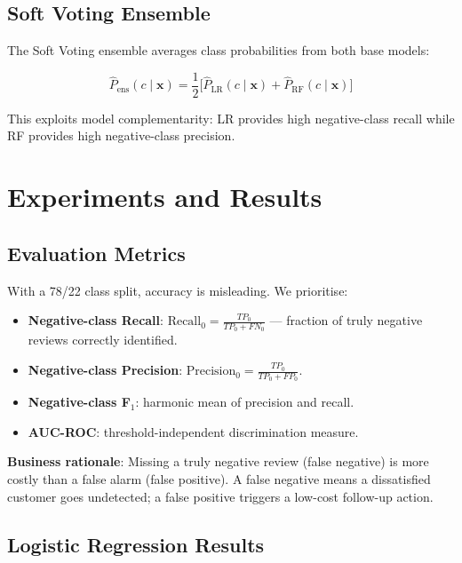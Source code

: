 \documentclass[11pt,a4paper]{article}
\begin{document}
\subsection{Soft Voting Ensemble}

The Soft Voting ensemble averages class probabilities from both base models:

\begin{equation}
  \hat{P}_{\mathrm{ens}}(c \mid \mathbf{x})
  = \frac{1}{2}\Big[
    \hat{P}_{\mathrm{LR}}(c \mid \mathbf{x}) +
    \hat{P}_{\mathrm{RF}}(c \mid \mathbf{x})
  \Big]
\end{equation}

This exploits model complementarity: LR provides high negative-class recall
while RF provides high negative-class precision.

\section{Experiments and Results}
\label{sec:experiments}

\subsection{Evaluation Metrics}

With a 78/22 class split, accuracy is misleading.
We prioritise:

\begin{itemize}[leftmargin=2em]
  \item \textbf{Negative-class Recall}:
        $\text{Recall}_0 = \frac{TP_0}{TP_0+FN_0}$ ---
        fraction of truly negative reviews correctly identified.
  \item \textbf{Negative-class Precision}:
        $\text{Precision}_0 = \frac{TP_0}{TP_0+FP_0}$.
  \item \textbf{Negative-class F$_1$}:
        harmonic mean of precision and recall.
  \item \textbf{AUC-ROC}: threshold-independent discrimination measure.
\end{itemize}

\textbf{Business rationale}: Missing a truly negative review (false negative)
is more costly than a false alarm (false positive). A false negative means
a dissatisfied customer goes undetected; a false positive triggers a
low-cost follow-up action.

\subsection{Logistic Regression Results}
\end{document}
